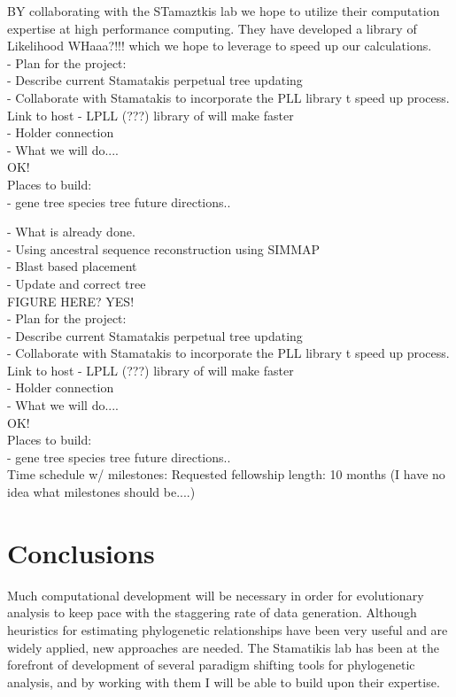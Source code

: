 \documentclass[10pt]{article}
\begin{document}
BY collaborating with the STamaztkis lab we hope to utilize their computation expertise at high performance computing. They have developed a library of Likelihood WHaaa?!!! which we hope to leverage to speed up our calculations.
\\  - Plan for the project:
\\     - Describe current Stamatakis perpetual tree updating
\\     - Collaborate with Stamatakis to incorporate the PLL library t speed up process.
\\Link to   host -  LPLL (???) library of will make faster
\\       - Holder connection
\\     - What we will do....
\\         OK!
\\     Places to build:
\\         - gene tree species tree future directions..





  - What is already done.\\
     - Using ancestral sequence reconstruction using SIMMAP\\
     - Blast based placement\\
     - Update and correct tree\\
     FIGURE HERE? YES!\\
  - Plan for the project:\\
     - Describe current Stamatakis perpetual tree updating\\
     - Collaborate with Stamatakis to incorporate the PLL library t speed up process.\\
Link to   host -  LPLL (???) library of will make faster\\

       - Holder connection\\
     - What we will do....\\
         OK!\\
     Places to build:\\
         - gene tree species tree future directions..\\
         
Time schedule w/ milestones:
   Requested fellowship length: 10 months
   (I have no idea what milestones should be....)

\section*{Conclusions}
Much computational development will be necessary in order for evolutionary analysis to keep pace with the staggering rate of data generation. Although heuristics for estimating phylogenetic relationships have been very useful and are widely applied, new approaches are needed. The Stamatikis lab has been at the forefront of development of several paradigm shifting tools for phylogenetic analysis, and by working with them I will be able to build upon their expertise.
\end{document}

